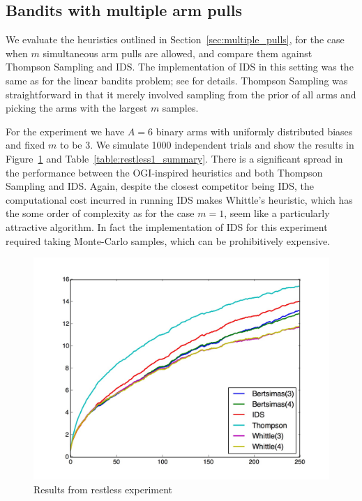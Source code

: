 \subsection{Bandits with multiple arm pulls}
We evaluate the heuristics outlined in Section~\ref{sec:multiple_pulls}, for the case when $m$ simultaneous arm pulls are allowed, and compare them against Thompson Sampling and IDS. The implementation of IDS in this setting was the same as for the linear bandits problem; see \citep{russo2014learning} for details. Thompson Sampling was straightforward in that it merely involved sampling from the prior of all arms and picking the arms with the largest $m$ samples. 

For the experiment we have $A = 6$ binary arms with uniformly  distributed biases and fixed $m$ to be 3. We simulate 1000 independent trials and show the results in Figure~\ref{fig:restless1} and Table~\ref{table:restless1_summary}. There is a significant spread in the performance between the OGI-inspired heuristics and both Thompson Sampling and IDS. Again, despite the closest competitor being IDS, the computational cost incurred in running IDS makes Whittle's heuristic, which has the some order of complexity as for the case $m=1$, seem like a particularly attractive algorithm. In fact the implementation of IDS for this experiment required taking Monte-Carlo samples, which can be prohibitively expensive.
\begin{figure}
	\centering
	\includegraphics[width=0.5\linewidth]{plots/restless1}
	\caption{Results from restless experiment}
	\label{fig:restless1}
\end{figure}

